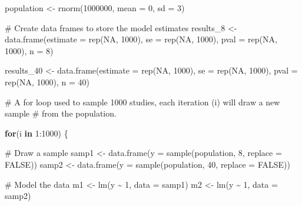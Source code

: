 \documentclass[
  letterpaper,
  DIV=11,
  numbers=noendperiod]{scrreprt}
\newenvironment{Shaded}{\begin{snugshade}}{\end{snugshade}}
\newcommand{\AttributeTok}[1]{\textcolor[rgb]{0.40,0.45,0.13}{#1}}
\newcommand{\CommentTok}[1]{\textcolor[rgb]{0.37,0.37,0.37}{#1}}
\newcommand{\ConstantTok}[1]{\textcolor[rgb]{0.56,0.35,0.01}{#1}}
\newcommand{\ControlFlowTok}[1]{\textcolor[rgb]{0.00,0.23,0.31}{\textbf{#1}}}
\newcommand{\DecValTok}[1]{\textcolor[rgb]{0.68,0.00,0.00}{#1}}
\newcommand{\FunctionTok}[1]{\textcolor[rgb]{0.28,0.35,0.67}{#1}}
\newcommand{\NormalTok}[1]{\textcolor[rgb]{0.00,0.23,0.31}{#1}}
\newcommand{\OtherTok}[1]{\textcolor[rgb]{0.00,0.23,0.31}{#1}}
\newcommand{\SpecialCharTok}[1]{\textcolor[rgb]{0.37,0.37,0.37}{#1}}
\begin{document}
\begin{Shaded}
\begin{Highlighting}[]
\NormalTok{population }\OtherTok{\textless{}{-}} \FunctionTok{rnorm}\NormalTok{(}\DecValTok{1000000}\NormalTok{, }\AttributeTok{mean =} \DecValTok{0}\NormalTok{, }\AttributeTok{sd =} \DecValTok{3}\NormalTok{)}


\CommentTok{\# Create data frames to store the model estimates}
\NormalTok{results\_8 }\OtherTok{\textless{}{-}} \FunctionTok{data.frame}\NormalTok{(}\AttributeTok{estimate =} \FunctionTok{rep}\NormalTok{(}\ConstantTok{NA}\NormalTok{, }\DecValTok{1000}\NormalTok{), }
                      \AttributeTok{se =} \FunctionTok{rep}\NormalTok{(}\ConstantTok{NA}\NormalTok{, }\DecValTok{1000}\NormalTok{), }
                      \AttributeTok{pval =} \FunctionTok{rep}\NormalTok{(}\ConstantTok{NA}\NormalTok{, }\DecValTok{1000}\NormalTok{), }
                      \AttributeTok{n =} \DecValTok{8}\NormalTok{)  }

\NormalTok{results\_40 }\OtherTok{\textless{}{-}} \FunctionTok{data.frame}\NormalTok{(}\AttributeTok{estimate =} \FunctionTok{rep}\NormalTok{(}\ConstantTok{NA}\NormalTok{, }\DecValTok{1000}\NormalTok{), }
                      \AttributeTok{se =} \FunctionTok{rep}\NormalTok{(}\ConstantTok{NA}\NormalTok{, }\DecValTok{1000}\NormalTok{), }
                      \AttributeTok{pval =} \FunctionTok{rep}\NormalTok{(}\ConstantTok{NA}\NormalTok{, }\DecValTok{1000}\NormalTok{), }
                      \AttributeTok{n =} \DecValTok{40}\NormalTok{)}

\CommentTok{\# A for loop used to sample 1000 studies, each iteration (i) will draw a new sample}
\CommentTok{\# from the population. }

\ControlFlowTok{for}\NormalTok{(i }\ControlFlowTok{in} \DecValTok{1}\SpecialCharTok{:}\DecValTok{1000}\NormalTok{) \{}
  
  \CommentTok{\# Draw a sample }
\NormalTok{  samp1 }\OtherTok{\textless{}{-}} \FunctionTok{data.frame}\NormalTok{(}\AttributeTok{y =} \FunctionTok{sample}\NormalTok{(population, }\DecValTok{8}\NormalTok{, }\AttributeTok{replace =} \ConstantTok{FALSE}\NormalTok{))}
\NormalTok{  samp2 }\OtherTok{\textless{}{-}} \FunctionTok{data.frame}\NormalTok{(}\AttributeTok{y =} \FunctionTok{sample}\NormalTok{(population, }\DecValTok{40}\NormalTok{, }\AttributeTok{replace =} \ConstantTok{FALSE}\NormalTok{))}

  \CommentTok{\# Model the data}
\NormalTok{  m1 }\OtherTok{\textless{}{-}} \FunctionTok{lm}\NormalTok{(y }\SpecialCharTok{\textasciitilde{}} \DecValTok{1}\NormalTok{, }\AttributeTok{data =}\NormalTok{ samp1)}
\NormalTok{  m2 }\OtherTok{\textless{}{-}} \FunctionTok{lm}\NormalTok{(y }\SpecialCharTok{\textasciitilde{}} \DecValTok{1}\NormalTok{, }\AttributeTok{data =}\NormalTok{ samp2)}
  

\end{Highlighting}
\end{Shaded}
\end{document}
